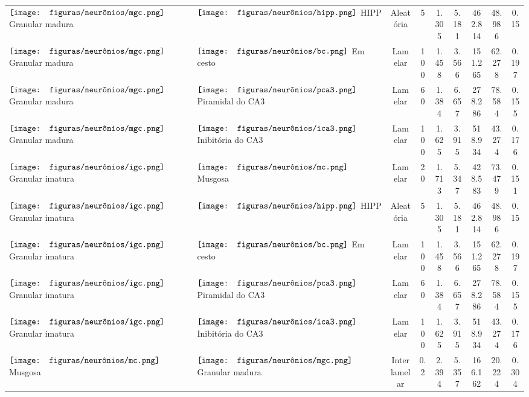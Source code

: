 \begin{table}[h!]
{\begin{tabular}{llccccccc}
$\vcenter{\hbox{\texttt{[image: figuras/neurônios/mgc.png]}}}$ Granular madura & $\vcenter{\hbox{\texttt{[image: figuras/neurônios/hipp.png]}}}$ HIPP & Aleatória & 5 & 1.305 & 5.181 & 462.814 & 48.986 & 0.15 \\
$\vcenter{\hbox{\texttt{[image: figuras/neurônios/mgc.png]}}}$ Granular madura & $\vcenter{\hbox{\texttt{[image: figuras/neurônios/bc.png]}}}$ Em cesto & Lamelar & 100 & 1.458 & 3.566 & 151.265 & 62.278 & 0.197 \\
$\vcenter{\hbox{\texttt{[image: figuras/neurônios/mgc.png]}}}$ Granular madura & $\vcenter{\hbox{\texttt{[image: figuras/neurônios/pca3.png]}}}$ Piramidal do CA3 & Lamelar & 60 & 1.384 & 6.657 & 278.286 & 78.584 & 0.155 \\
$\vcenter{\hbox{\texttt{[image: figuras/neurônios/mgc.png]}}}$ Granular madura & $\vcenter{\hbox{\texttt{[image: figuras/neurônios/ica3.png]}}}$ Inibitória do CA3 & Lamelar & 100 & 1.625 & 3.915 & 518.934 & 43.274 & 0.176 \\
$\vcenter{\hbox{\texttt{[image: figuras/neurônios/igc.png]}}}$ Granular imatura & $\vcenter{\hbox{\texttt{[image: figuras/neurônios/mc.png]}}}$ Musgosa & Lamelar & 20 & 1.713 & 5.347 & 428.583 & 73.479 & 0.151 \\
$\vcenter{\hbox{\texttt{[image: figuras/neurônios/igc.png]}}}$ Granular imatura & $\vcenter{\hbox{\texttt{[image: figuras/neurônios/hipp.png]}}}$ HIPP & Aleatória & 5 & 1.305 & 5.181 & 462.814 & 48.986 & 0.15 \\
$\vcenter{\hbox{\texttt{[image: figuras/neurônios/igc.png]}}}$ Granular imatura & $\vcenter{\hbox{\texttt{[image: figuras/neurônios/bc.png]}}}$ Em cesto & Lamelar & 100 & 1.458 & 3.566 & 151.265 & 62.278 & 0.197 \\
$\vcenter{\hbox{\texttt{[image: figuras/neurônios/igc.png]}}}$ Granular imatura & $\vcenter{\hbox{\texttt{[image: figuras/neurônios/pca3.png]}}}$ Piramidal do CA3 & Lamelar & 60 & 1.384 & 6.657 & 278.286 & 78.584 & 0.155 \\
$\vcenter{\hbox{\texttt{[image: figuras/neurônios/igc.png]}}}$ Granular imatura & $\vcenter{\hbox{\texttt{[image: figuras/neurônios/ica3.png]}}}$ Inibitória do CA3 & Lamelar & 100 & 1.625 & 3.915 & 518.934 & 43.274 & 0.176 \\
$\vcenter{\hbox{\texttt{[image: figuras/neurônios/mc.png]}}}$ Musgosa & $\vcenter{\hbox{\texttt{[image: figuras/neurônios/mgc.png]}}}$ Granular madura & Interlamelar & 0.2 & 2.394 & 5.357 & 166.162 & 20.224 & 0.304 \\

\end{tabular}}
\end{table}
